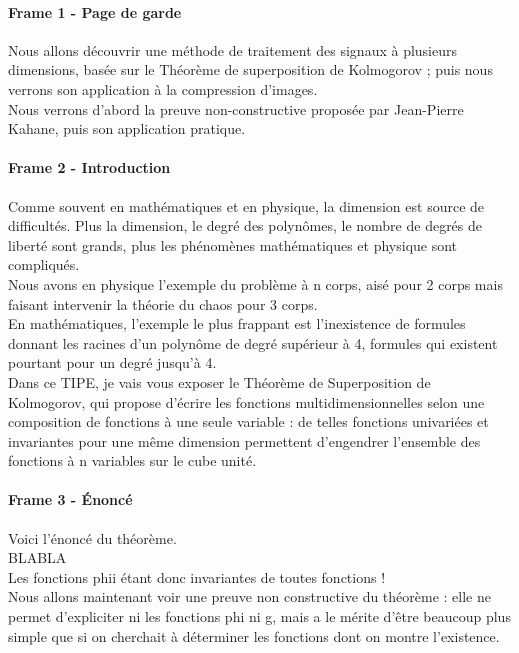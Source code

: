 \documentclass[12pt,a4paper]{article}
\begin{document}
\paragraph{Frame 1 - Page de garde}
Nous allons découvrir une méthode de traitement des signaux à plusieurs dimensions, basée sur le Théorème de superposition de Kolmogorov ; puis nous verrons son application à la compression d'images.\\

Nous verrons d'abord la preuve non-constructive proposée par Jean-Pierre Kahane, puis son application pratique.\\

\paragraph{Frame 2 - Introduction} Comme souvent en mathématiques et en physique, la dimension est source de difficultés. Plus la dimension, le degré des polynômes, le nombre de degrés de liberté sont grands, plus les phénomènes mathématiques et physique sont compliqués.\\

Nous avons en physique l'exemple du problème à n corps, aisé pour 2 corps mais faisant intervenir la théorie du chaos pour 3 corps.\\
En mathématiques, l'exemple le plus frappant est l'inexistence de formules donnant les racines d'un polynôme de degré supérieur à 4, formules qui existent pourtant pour un degré jusqu'à 4.\\

Dans ce TIPE, je vais vous exposer le Théorème de Superposition de Kolmogorov, qui propose d'écrire les fonctions multidimensionnelles selon une composition de fonctions à une seule variable : de telles fonctions univariées et invariantes pour une même dimension permettent d'engendrer l'ensemble des fonctions à n variables sur le cube unité.\\

\paragraph{Frame 3 - Énoncé}
Voici l'énoncé du théorème.\\
BLABLA\\
Les fonctions phii étant donc invariantes de toutes fonctions !\\

Nous allons maintenant voir une preuve non constructive du théorème : elle ne permet d'expliciter ni les fonctions phi ni g, mais a le mérite d'être beaucoup plus simple que si on cherchait à déterminer les fonctions dont on montre l'existence.\\
\end{document}
